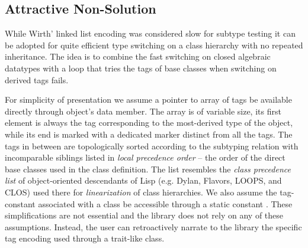\subsection{Attractive Non-Solution}
\label{sec:cotc}



While Wirth' linked list encoding was considered slow for subtype testing it can 
be adopted for quite efficient type switching on a class hierarchy with no 
repeated inheritance. The idea is to combine the fast switching on closed 
algebraic datatypes with a loop that tries the tags of base classes when 
switching on derived tags fails.


For simplicity of presentation we assume a pointer to array of tags be available 
directly through object's  data member. The array is of 
variable size, its first element is always the tag corresponding to the 
most-derived type of the object, while its end is marked with a dedicated 
 marker distinct from all the tags. The tags in between are 
topologically sorted according to the subtyping relation with incomparable 
siblings listed in \emph{local precedence order} -- the order of the direct base 
classes used in the class definition. The list resembles the \emph{class 
precedence list} of object-oriented descendants of Lisp (e.g. Dylan, Flavors, 
LOOPS, and CLOS) used there for \emph{linearization} of class hierarchies.
We also assume the tag-constant associated with a class 
 be accessible through a static constant . These 
simplifications are not essential and the library does not rely on any of these 
assumptions. Instead, the user can retroactively narrate to the library the 
specific tag encoding used through a trait-like class.

